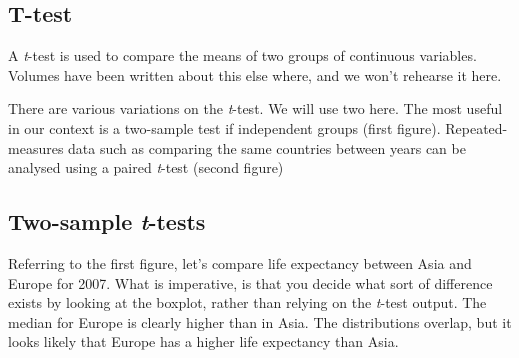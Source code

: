 \documentclass[12pt,]{krantz}
\makeatletter
\newenvironment{Shaded}{\begin{snugshade}}{\end{snugshade}}
\newcommand{\CommentTok}[1]{\textcolor[rgb]{0.56,0.35,0.01}{\textit{#1}}}
\newcommand{\DataTypeTok}[1]{\textcolor[rgb]{0.13,0.29,0.53}{#1}}
\newcommand{\DecValTok}[1]{\textcolor[rgb]{0.00,0.00,0.81}{#1}}
\newcommand{\KeywordTok}[1]{\textcolor[rgb]{0.13,0.29,0.53}{\textbf{#1}}}
\newcommand{\NormalTok}[1]{#1}
\newcommand{\OperatorTok}[1]{\textcolor[rgb]{0.81,0.36,0.00}{\textbf{#1}}}
\newcommand{\StringTok}[1]{\textcolor[rgb]{0.31,0.60,0.02}{#1}}
\newenvironment{kframe}{%
\medskip{}
\setlength{\fboxsep}{.8em}
 \def\at@end@of@kframe{}%
 \ifinner\ifhmode%
  \def\at@end@of@kframe{\end{minipage}}%
  \begin{minipage}{\columnwidth}%
 \fi\fi%
 \def\FrameCommand##1{\hskip\@totalleftmargin \hskip-\fboxsep
 \colorbox{shadecolor}{##1}\hskip-\fboxsep
     \hskip-\linewidth \hskip-\@totalleftmargin \hskip\columnwidth}%
 \MakeFramed {\advance\hsize-\width
   \@totalleftmargin\z@ \linewidth\hsize
   \@setminipage}}%
 {\par\unskip\endMakeFramed%
 \at@end@of@kframe}
\renewenvironment{Shaded}{\begin{kframe}}{\end{kframe}}
\theoremstyle{definition}
\theoremstyle{definition}
\theoremstyle{definition}
\theoremstyle{remark}
\makeatother
\begin{document}
\hypertarget{t-test}{%
\subsection{T-test}\label{t-test}}

 A \emph{t}-test is used to compare the
means of two groups of continuous variables. Volumes have been written
about this else where, and we won't rehearse it here.

There are various variations on the \emph{t}-test. We will use two here.
The most useful in our context is a two-sample test if independent
groups (first figure). Repeated-measures data such as comparing the same
countries between years can be analysed using a paired \emph{t}-test
(second figure)

\hypertarget{two-sample-t-tests}{%
\subsection{\texorpdfstring{Two-sample
\emph{t}-tests}{Two-sample t-tests}}\label{two-sample-t-tests}}


Referring to the first figure, let's compare life expectancy between
Asia and Europe for 2007. What is imperative, is that you decide what
sort of difference exists by looking at the boxplot, rather than relying
on the \emph{t}-test output. The median for Europe is clearly higher
than in Asia. The distributions overlap, but it looks likely that Europe
has a higher life expectancy than Asia.

\begin{Shaded}
\end{Shaded}
\end{document}
